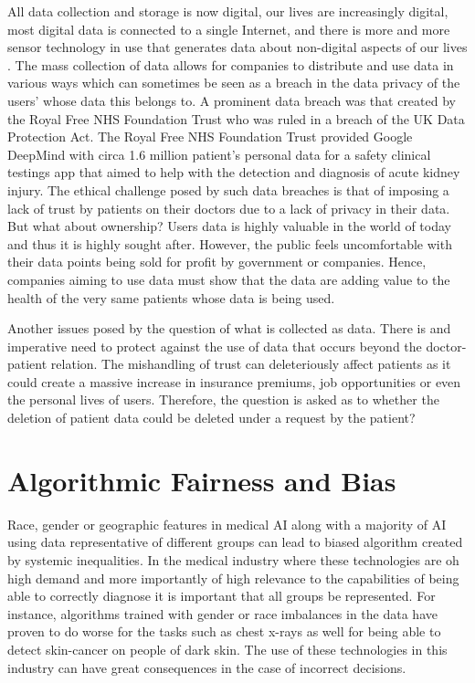 \documentclass[a4paper,12pt,oneside]{report}
\begin{document}
All data collection and storage is now digital, our lives are increasingly digital, most digital data is connected to a single Internet, and there is more and more sensor technology in use that generates data about non-digital aspects of our lives \cite{1}. The mass collection of data allows for companies to distribute and use data in various ways which can sometimes be seen as a breach in the data privacy of the users' whose data this belongs to. A prominent data breach was that created by the Royal Free NHS Foundation Trust who was ruled in a breach of the UK Data Protection Act. The Royal Free NHS Foundation Trust provided Google DeepMind with circa 1.6 million patient's personal data for a safety clinical testings app that aimed to help with the detection and diagnosis of acute kidney injury. The ethical challenge posed by such data breaches is that of imposing a lack of trust by patients on their doctors due to a lack of privacy in their data. But what about ownership? Users data is highly valuable in the world of today and thus it is highly sought after. However, the public feels uncomfortable with their data points being sold for profit by government or companies. Hence, companies aiming to use data must show that the data are adding value to the health of the very same patients whose data is being used.

 Another issues posed by the question of what is collected as data. There is and imperative need to protect against the use of data that occurs beyond the doctor-patient relation. The mishandling of trust can deleteriously affect patients as it could create a massive increase in insurance premiums, job opportunities or even the personal lives of users. Therefore, the question is asked as to whether the deletion of patient data could be deleted under a request by the patient?
 
 \section{Algorithmic Fairness and Bias}
 
Race, gender or geographic features in medical AI along with a majority of AI using data representative of different groups can lead to biased algorithm created by systemic inequalities. In the medical industry where these technologies are oh high demand and more importantly of high relevance to the capabilities of being able to correctly diagnose it is important that all groups be represented. For instance, algorithms trained with gender or race imbalances in the data have proven to do worse for the tasks such as chest x-rays as well for being able to detect skin-cancer on people of dark skin. The use of these technologies in this industry can have great consequences in the case of incorrect decisions. 
\end{document}
